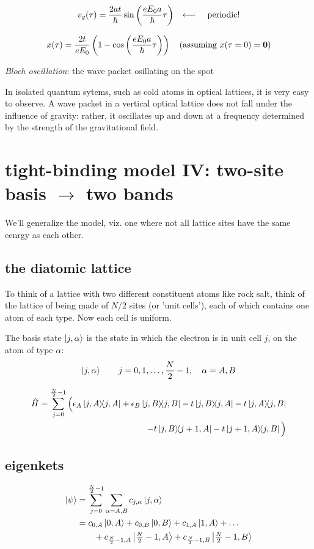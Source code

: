 \documentclass[10pt, a4paper, twocolumn]{article}
\newcommand{\deff}[1]{\par \noindent \textit{#1}: }
\newcommand{\larr}{\ensuremath{\longleftarrow\ }}
\begin{document}
\[ v_g(\tau) = \frac{2at}{\hbar}
\sin \qty(\frac{eE_0a}{\hbar} \tau)
\qq{\larr} \text{periodic!} \]

\[x(\tau) = \frac{2t}{eE_0}
\left(1-\cos\qty(\frac{eE_0a}{\hbar}\tau) \right)
\quad (\text{assuming } x(\tau =0)=\vb 0) \]

\deff{Bloch oscillation}
the wave packet osillating on the spot

In isolated quantum sytems, such as cold atoms in optical lattices, it is very easy to observe. A wave packet in a vertical optical lattice does not fall under the influence of gravity: rather, it oscillates up and down at a frequency determined by the strength of the gravitational field.

\section{tight-binding model IV: two-site basis $\rightarrow$ two bands}
We'll generalize the model, viz. one where not all lattice sites have the same eenrgy as each other.

\subsection{the diatomic lattice}

To think of a lattice with two different constituent atoms like rock salt, think of the lattice of being made of $N/2$ sites (or 'unit cells'), each of which contains one atom of each type. Now each cell is uniform.

The basis state $\ket{j,\alpha}$ is the state in which the electron is in unit cell $j$, on the atom of type $\alpha$:
\[\ket{j,\alpha}
\qquad j = 0, 1, \ldots , \frac{N}{2}-1,
\quad \alpha = A,B \]

\begin{equation*} \begin{split}
\hat H =\sum _{j=0}^{\frac{N}{2} -1} \Big(
\epsilon _A \dyad{j,A}{j,A} + \epsilon _B \dyad{j,B}{j,B}
- t\dyad{j,B}{j,A} - t\dyad{j,A}{j,B}
\\ - t\dyad{j,B}{j+1,A} - t\dyad{j+1,A}{j,B} \Big)
\end{split} \end{equation*}

\subsection{eigenkets}

\begin{equation*}
\begin{aligned}
\ket\psi &= \sum _{j=0}^{\frac{N}{2}-1}
\sum _{\alpha =A,B} c_{j,\alpha} \ket{j,\alpha}
\\&=
c_{0,A} \ket{0,A} + c_{0,B} \ket{0,B}
+ c_{1,A} \ket{1,A} +\ldots
\\ & \qquad + c_{\frac{N}{2} -1,A} \ket{\tfrac{N}{2} -1,A}
+ c_{\frac{N}{2} -1,B} \ket{\tfrac{N}{2} -1,B}
\end{aligned}
\end{equation*}
\end{document}

